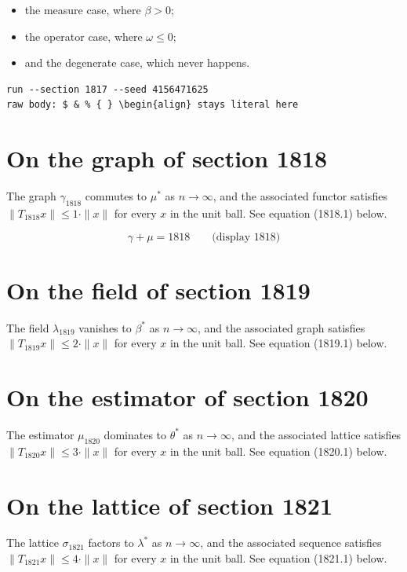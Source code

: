 \documentclass{article}
\begin{document}
\begin{itemize}
  \item the measure case, where $\beta > 0$;
  \item the operator case, where $\omega \leq 0$;
  \item and the degenerate case, which never happens.
\end{itemize}

\begin{verbatim}
run --section 1817 --seed 4156471625
raw body: $ & % { } \begin{align} stays literal here
\end{verbatim}

\section{On the graph of section 1818}
The graph $\gamma_{1818}$ commutes to $\mu^{*}$ as $n \to \infty$,
and the associated functor satisfies $\|T_{1818} x\| \leq 1 \cdot \|x\|$
for every $x$ in the unit ball. See equation (1818.1) below.

$$
\gamma + \mu = 1818 \qquad \text{(display 1818)}
$$

\section{On the field of section 1819}
The field $\lambda_{1819}$ vanishes to $\beta^{*}$ as $n \to \infty$,
and the associated graph satisfies $\|T_{1819} x\| \leq 2 \cdot \|x\|$
for every $x$ in the unit ball. See equation (1819.1) below.

\section{On the estimator of section 1820}
The estimator $\mu_{1820}$ dominates to $\theta^{*}$ as $n \to \infty$,
and the associated lattice satisfies $\|T_{1820} x\| \leq 3 \cdot \|x\|$
for every $x$ in the unit ball. See equation (1820.1) below.

\section{On the lattice of section 1821}
The lattice $\sigma_{1821}$ factors to $\lambda^{*}$ as $n \to \infty$,
and the associated sequence satisfies $\|T_{1821} x\| \leq 4 \cdot \|x\|$
for every $x$ in the unit ball. See equation (1821.1) below.
\end{document}
